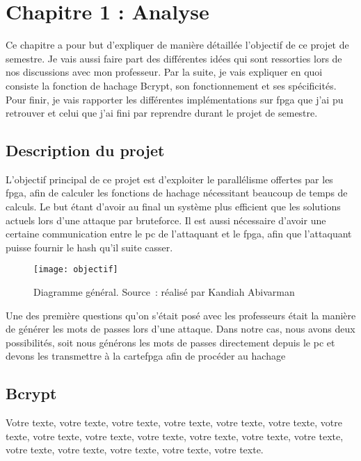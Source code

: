 \chapter{Chapitre 1 : Analyse}

Ce chapitre a pour but d'expliquer de manière détaillée l'objectif de ce projet de semestre. Je vais aussi faire part des différentes idées qui sont ressorties lors de nos discussions avec mon professeur. Par la suite, je vais expliquer en quoi consiste la fonction de hachage Bcrypt, son fonctionnement et ses spécificités. Pour finir, je vais rapporter les différentes implémentations sur \gls{fpga} que j'ai pu retrouver et celui que j'ai fini par reprendre durant le projet de semestre. 

\section{Description du projet}

L'objectif principal de ce projet est d'exploiter le parallélisme offertes par les \gls{fpga}, afin de calculer les fonctions de hachage nécessitant beaucoup de temps de calculs. Le but étant d'avoir au final un système plus efficient que les solutions actuels lors d'une attaque par bruteforce. Il est aussi nécessaire d'avoir une certaine communication entre le \gls{pc} de l'attaquant et le \gls{fpga}, afin que l'attaquant puisse fournir le hash qu'il suite casser.

\begin{figure}[tbph!]
	\centering
	\texttt{[image: objectif]}
	\caption[Diagramme général]{Diagramme général. Source : réalisé par Kandiah Abivarman}
	\label{fig:objectif}
\end{figure}

Une des première questions qu'on s'était posé avec les professeurs était la manière de générer les mots de passes lors d'une attaque. Dans notre cas, nous avons deux possibilités, soit nous générons les mots de passes directement depuis le \gls{pc} et devons les transmettre à la carte\gls{fpga} afin de procéder au hachage 

\section{Bcrypt}

Votre texte, votre texte, votre texte, votre texte, votre texte, votre texte, votre texte, votre texte, votre texte, votre texte, votre texte, votre texte, votre texte, votre texte, votre texte, votre texte, votre texte, votre texte.

